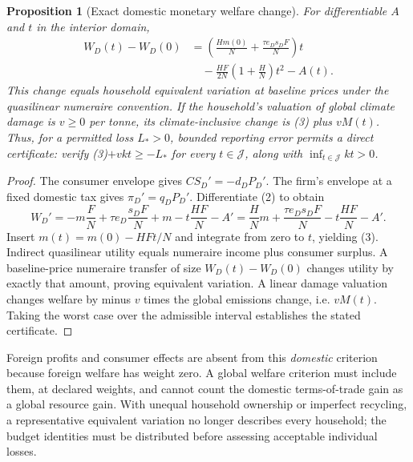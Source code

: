 \documentclass[11pt]{article}
\newtheorem{proposition}[theorem]{Proposition}
\begin{document}
\begin{proposition}[Exact domestic monetary welfare change]
For differentiable $A$ and $t$ in the interior domain,
\begin{align}
 W_D(t)-W_D(0)
 &=\left(\frac{Hm(0)}{N}+\frac{\tau e_Ds_DF}{N}\right)t\nonumber\\
 &\quad-\frac{HF}{2N}\left(1+\frac HN\right)t^2-A(t).       \tag{3}
\end{align}
This change equals household equivalent variation at baseline prices
under the quasilinear numeraire convention. If the household's valuation
of global climate damage is $v\geq0$ per tonne, its climate-inclusive
change is (3) plus $vM(t)$. Thus, for a permitted loss $L_*>0$, bounded
reporting error permits a direct certificate: verify (3)$+vkt\geq-L_*$
for every $t\in\mathcal J$, along with $\inf_{t\in\mathcal J}kt>0$.
\end{proposition}
\begin{proof}
The consumer envelope gives $CS_D'=-d_DP_D'$. The firm's envelope at a
fixed domestic tax gives $\pi_D'=q_DP_D'$. Differentiate (2) to obtain
\[
 W_D'= -m\frac FN+\tau e_D\frac{s_DF}{N}
             +m-t\frac{HF}{N}-A'
       =\frac HN m+\frac{\tau e_Ds_DF}{N}
                    -t\frac{HF}{N}-A'.
\]
Insert $m(t)=m(0)-HFt/N$ and integrate from zero to $t$, yielding (3).
Indirect quasilinear utility equals numeraire income plus consumer surplus.
A baseline-price numeraire transfer of size $W_D(t)-W_D(0)$ changes utility
by exactly that amount, proving equivalent variation. A linear damage
valuation changes welfare by minus $v$ times the global emissions change,
i.e. $vM(t)$. Taking the worst case over the admissible interval establishes
the stated certificate.
\end{proof}

Foreign profits and consumer effects are absent from this \emph{domestic}
criterion because foreign welfare has weight zero. A global welfare
criterion must include them, at declared weights, and cannot count the
domestic terms-of-trade gain as a global resource gain. With unequal
household ownership or imperfect recycling, a representative equivalent
variation no longer describes every household; the budget identities
must be distributed before assessing acceptable individual losses.
\end{document}
